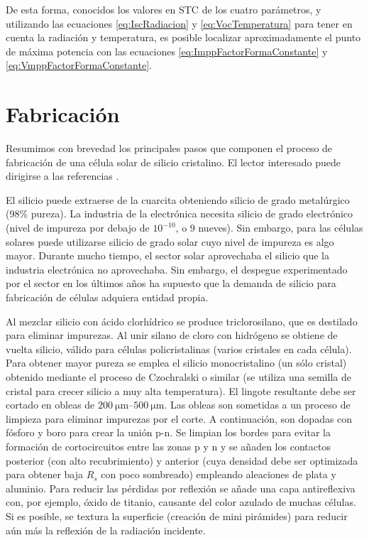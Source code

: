 De esta forma, conocidos los valores en STC de los cuatro parámetros,
y utilizando las ecuaciones \ref{eq:IscRadiacion} y \ref{eq:VocTemperatura}
para tener en cuenta la radiación y temperatura, es posible localizar
aproximadamente el punto de máxima potencia con las ecuaciones \ref{eq:ImppFactorFormaConstante}
y \ref{eq:VmppFactorFormaConstante}.


\section{Fabricación}

Resumimos con brevedad los principales pasos que componen el proceso
de fabricación de una célula solar de silicio cristalino. El lector
interesado puede dirigirse a las referencias \citep{Luque.Hegedus2003,Castaner.Markvart2003,Green1995}.

El silicio puede extraerse de la cuarcita obteniendo silicio de grado
metalúrgico (98\% pureza). La industria de la electrónica necesita
silicio de grado electrónico (nivel de impureza por debajo de $10^{-10}$,
o 9 nueves). Sin embargo, para las células solares puede utilizarse
silicio de grado solar cuyo nivel de impureza es algo mayor. Durante
mucho tiempo, el sector solar aprovechaba el silicio que la industria
electrónica no aprovechaba. Sin embargo, el despegue experimentado
por el sector en los últimos años ha supuesto que la demanda de silicio
para fabricación de células adquiera entidad propia.

Al mezclar silicio con ácido clorhídrico se produce triclorosilano,
que es destilado para eliminar impurezas. Al unir silano de cloro
con hidrógeno se obtiene de vuelta silicio, válido para células policristalinas
(varios cristales en cada célula). Para obtener mayor pureza se emplea
el silicio monocristalino (un sólo cristal) obtenido mediante el proceso
de Czochralski o similar (se utiliza una semilla de cristal para crecer
silicio a muy alta temperatura). El lingote resultante debe ser cortado
en obleas de $\SIrange[range-phrase=-]{200}{500}{\micro\meter}$. Las
obleas son sometidas a un proceso de limpieza para eliminar impurezas
por el corte. A continuación, son dopadas con fósforo y boro para
crear la unión p-n. Se limpian los bordes para evitar la formación
de cortocircuitos entre las zonas p y n y se añaden los contactos
posterior (con alto recubrimiento) y anterior (cuya densidad debe
ser optimizada para obtener baja $R_{s}$ con poco sombreado) empleando
aleaciones de plata y aluminio. Para reducir las pérdidas por reflexión
se añade una capa antireflexiva con, por ejemplo, óxido de titanio,
causante del color azulado de muchas células. Si es posible, se textura
la superficie (creación de mini pirámides) para reducir aún más la
reflexión de la radiación incidente.

